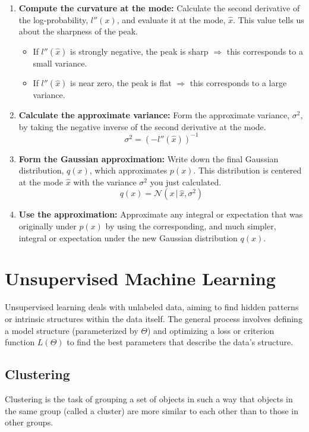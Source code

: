 \documentclass{article}
\begin{document}
\begin{multicols}{2}
\begin{enumerate}
		\item \textbf{Compute the curvature at the mode:}
		      Calculate the second derivative of the log-probability, $l''(x)$, and evaluate it at the mode, $\hat{x}$. This value tells us about the sharpness of the peak.
		      \begin{itemize}
			      \item If $l''(\hat{x})$ is strongly negative, the peak is sharp $\Rightarrow$ this corresponds to a small variance.
			      \item If $l''(\hat{x})$ is near zero, the peak is flat $\Rightarrow$ this corresponds to a large variance.
		      \end{itemize}

		\item \textbf{Calculate the approximate variance:}
		      Form the approximate variance, $\sigma^2$, by taking the negative inverse of the second derivative at the mode.
		      $$ \sigma^2 = (-l''(\hat{x}))^{-1} $$

		\item \textbf{Form the Gaussian approximation:}
		      Write down the final Gaussian distribution, $q(x)$, which approximates $p(x)$. This distribution is centered at the mode $\hat{x}$ with the variance $\sigma^2$ you just calculated.
		      $$ q(x) = \mathcal{N}(x \,|\, \hat{x}, \sigma^2) $$

		\item \textbf{Use the approximation:}
		      Approximate any integral or expectation that was originally under $p(x)$ by using the corresponding, and much simpler, integral or expectation under the new Gaussian distribution $q(x)$.

	\end{enumerate}

	\section{Unsupervised Machine Learning}
	Unsupervised learning deals with unlabeled data, aiming to find hidden patterns or intrinsic structures within the data itself. The general process involves defining a model structure (parameterized by $\Theta$) and optimizing a loss or criterion function $L(\Theta)$ to find the best parameters that describe the data's structure.

	\subsection{Clustering}
	Clustering is the task of grouping a set of objects in such a way that objects in the same group (called a cluster) are more similar to each other than to those in other groups.


\end{multicols}
\end{document}
